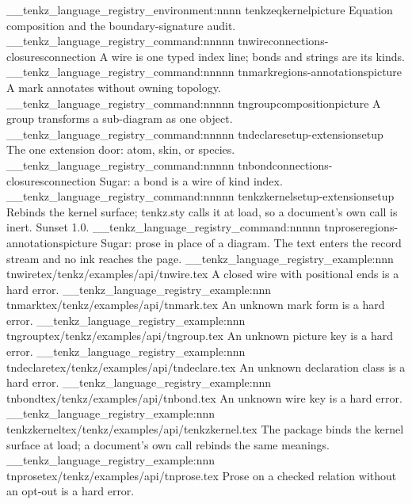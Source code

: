 %
\__tenkz_language_registry_environment:nnnn {tenkzeq}{kernel}{picture}
  {Equation composition and the boundary-signature audit.}
\__tenkz_language_registry_command:nnnnn {tnwire}{connections-closures}{connection}
  {}{A wire is one typed index line; bonds and strings are its kinds.}
\__tenkz_language_registry_command:nnnnn {tnmark}{regions-annotations}{picture}
  {}{A mark annotates without owning topology.}
\__tenkz_language_registry_command:nnnnn {tngroup}{composition}{picture}
  {}{A group transforms a sub-diagram as one object.}
\__tenkz_language_registry_command:nnnnn {tndeclare}{setup-extension}{setup}
  {}{The one extension door: atom, skin, or species.}
\__tenkz_language_registry_command:nnnnn {tnbond}{connections-closures}{connection}
  {}{Sugar: a bond is a wire of kind index.}
\__tenkz_language_registry_command:nnnnn {tenkzkernel}{setup-extension}{setup}
  {\tenkzkernel}{Rebinds the kernel surface; tenkz.sty calls it at load, so a document's own call is inert. Sunset 1.0.}
\__tenkz_language_registry_command:nnnnn {tnprose}{regions-annotations}{picture}
  {}{Sugar: prose in place of a diagram. The text enters the record stream and no ink reaches the page.}
\__tenkz_language_registry_example:nnn {tnwire}{tex/tenkz/examples/api/tnwire.tex}
  {A closed wire with positional ends is a hard error.}
\__tenkz_language_registry_example:nnn {tnmark}{tex/tenkz/examples/api/tnmark.tex}
  {An unknown mark form is a hard error.}
\__tenkz_language_registry_example:nnn {tngroup}{tex/tenkz/examples/api/tngroup.tex}
  {An unknown picture key is a hard error.}
\__tenkz_language_registry_example:nnn {tndeclare}{tex/tenkz/examples/api/tndeclare.tex}
  {An unknown declaration class is a hard error.}
\__tenkz_language_registry_example:nnn {tnbond}{tex/tenkz/examples/api/tnbond.tex}
  {An unknown wire key is a hard error.}
\__tenkz_language_registry_example:nnn {tenkzkernel}{tex/tenkz/examples/api/tenkzkernel.tex}
  {The package binds the kernel surface at load; a document's own call rebinds the same meanings.}
\__tenkz_language_registry_example:nnn {tnprose}{tex/tenkz/examples/api/tnprose.tex}
  {Prose on a checked relation without an opt-out is a hard error.}

